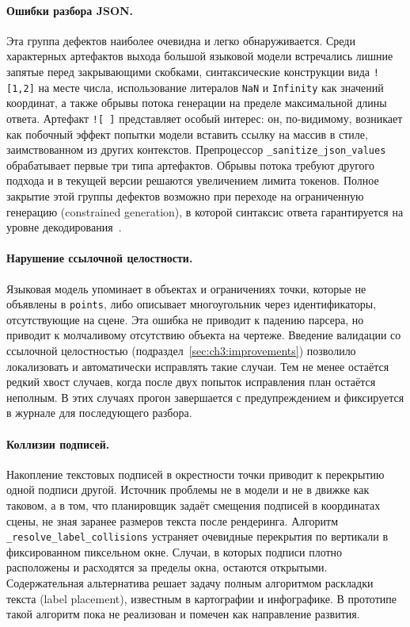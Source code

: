 \paragraph{Ошибки разбора JSON.} Эта группа дефектов наиболее очевидна и легко обнаруживается. Среди характерных артефактов выхода большой языковой модели встречались лишние запятые перед закрывающими скобками, синтаксические конструкции вида \verb|![1,2]| на месте числа, использование литералов \texttt{NaN} и \texttt{Infinity} как значений координат, а также обрывы потока генерации на пределе максимальной длины ответа. Артефакт \verb|![ ]| представляет особый интерес: он, по\nobreakdash-видимому, возникает как побочный эффект попытки модели вставить ссылку на массив в стиле, заимствованном из других контекстов. Препроцессор \texttt{\_sanitize\_json\_values} обрабатывает первые три типа артефактов. Обрывы потока требуют другого подхода и в текущей версии решаются увеличением лимита токенов. Полное закрытие этой группы дефектов возможно при переходе на ограниченную генерацию (constrained generation), в которой синтаксис ответа гарантируется на уровне декодирования~\cite{Willard2023Outlines, BeurerKellner2023LMQL}.

\paragraph{Нарушение ссылочной целостности.} Языковая модель упоминает в объектах и ограничениях точки, которые не объявлены в \texttt{points}, либо описывает многоугольник через идентификаторы, отсутствующие на сцене. Эта ошибка не приводит к падению парсера, но приводит к молчаливому отсутствию объекта на чертеже. Введение валидации со ссылочной целостностью (подраздел~\ref{sec:ch3:improvements}) позволило локализовать и автоматически исправлять такие случаи. Тем не менее остаётся редкий хвост случаев, когда после двух попыток исправления план остаётся неполным. В этих случаях прогон завершается с предупреждением и фиксируется в журнале для последующего разбора.

\paragraph{Коллизии подписей.} Накопление текстовых подписей в окрестности точки приводит к перекрытию одной подписи другой. Источник проблемы не в модели и не в движке как таковом, а в том, что планировщик задаёт смещения подписей в координатах сцены, не зная заранее размеров текста после рендеринга. Алгоритм \texttt{\_resolve\_label\_collisions} устраняет очевидные перекрытия по вертикали в фиксированном пиксельном окне. Случаи, в которых подписи плотно расположены и расходятся за пределы окна, остаются открытыми. Содержательная альтернатива решает задачу полным алгоритмом раскладки текста (label placement), известным в картографии и инфографике. В прототипе такой алгоритм пока не реализован и помечен как направление развития.

